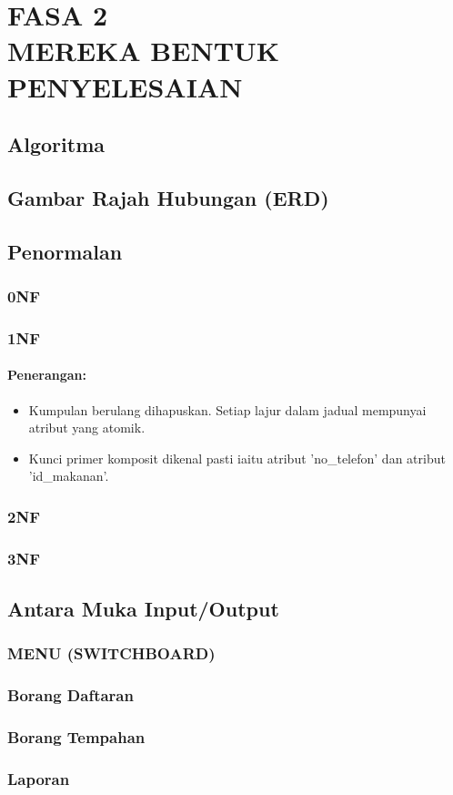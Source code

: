 \documentclass[main.tex]{subfiles}
\begin{document}
\newpage
\section{FASA 2 \\[1em] MEREKA BENTUK PENYELESAIAN}

\subsection{Algoritma}
\subsection{Gambar Rajah Hubungan (ERD)}
\subsection{Penormalan}
\subsubsection*{0NF}

\subsubsection*{1NF}
\paragraph{Penerangan:}
\begin{itemize}
    \item Kumpulan berulang dihapuskan. Setiap lajur dalam jadual mempunyai atribut yang atomik.
    \item Kunci primer komposit dikenal pasti iaitu atribut 'no\_telefon' dan atribut 'id\_makanan'.
\end{itemize}

\subsubsection*{2NF}

\subsubsection*{3NF}

\subsection{Antara Muka Input/Output}

\subsubsection*{MENU (SWITCHBOARD)}
\subsubsection*{Borang Daftaran}
\subsubsection*{Borang Tempahan}
\subsubsection*{Laporan}
\end{document}
